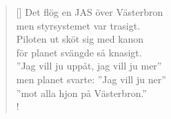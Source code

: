 \documentclass[11pt, a4paper]{article} %
\begin{document}
\begin{verse}[\versewidth]
Det flög en JAS över Västerbron \\
men styrsystemet var trasigt. \\
Piloten ut sköt sig med kanon \\
för planet svängde så knasigt. \\
''Jag vill ju uppåt, jag vill ju mer''\\ 
men planet svarte: ''Jag vill ju ner'' \\
''mot alla hjon på Västerbron.'' \\!


\end{verse}

\restoregeometry
\end{document}
